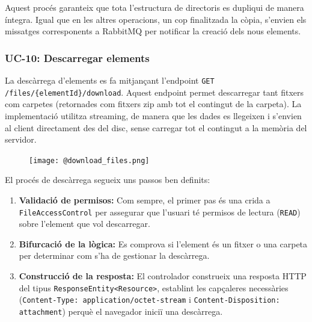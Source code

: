 Aquest procés garanteix que tota l'estructura de directoris es dupliqui de manera íntegra. Igual que en les altres operacions, un cop finalitzada la còpia, s'envien els missatges corresponents a RabbitMQ per notificar la creació dels nous elements.

\subsubsection{UC-10: Descarregar elements}

La descàrrega d'elements es fa mitjançant l'endpoint \texttt{GET /files/\{elementId\}/download}. Aquest endpoint permet descarregar tant fitxers com carpetes (retornades com fitxers zip amb tot el contingut de la carpeta). La implementació utilitza streaming, de manera que les dades es llegeixen i s'envien al client directament des del disc, sense carregar tot el contingut a la memòria del servidor.

\begin{figure}[H]
    \centering
    \texttt{[image: @download\_files.png]}
\end{figure}

El procés de descàrrega segueix uns passos ben definits:
\begin{enumerate}
    \item \textbf{Validació de permisos:} Com sempre, el primer pas és una crida a \texttt{FileAccessControl} per assegurar que l'usuari té permisos de lectura (\texttt{READ}) sobre l'element que vol descarregar.
    \item \textbf{Bifurcació de la lògica:} Es comprova si l'element és un fitxer o una carpeta per determinar com s'ha de gestionar la descàrrega.
    \item \textbf{Construcció de la resposta:} El controlador construeix una resposta HTTP del tipus \texttt{ResponseEntity<Resource>}, establint les capçaleres necessàries (\texttt{Content-Type: application/octet-stream} i \texttt{Content-Disposition: attachment}) perquè el navegador iniciï una descàrrega.
\end{enumerate}


